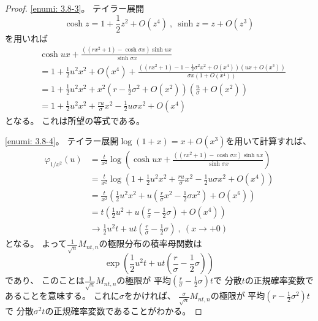 \documentclass[uplatex]{jsarticle}
\theoremstyle{definition}
\begin{document}
\begin{proof}
  \ref{enumi: 3.8-3}。
  テイラー展開
  \[
  \cosh z = 1 + \frac{1}{2}z^2 + O(z^4) \ , \
  \sinh z = z + O(z^3)
  \]
  を用いれば
  \begin{align*}
    &\cosh ux + \frac{
    ((rx^2+1)- \cosh \sigma x )\sinh ux
    }{\sinh \sigma x} \\
    &= 1 + \frac{1}{2}u^2x^2 + O(x^4)
    + \frac{
    \left((rx^2+1) - 1 - \frac{1}{2}\sigma^2x^2 + O(x^4)\right)(ux + O(x^3))
    }{\sigma x ( 1 + O(x^4))} \\
    &= 1 + \frac{1}{2}u^2x^2
    + x^2\left( r - \frac{1}{2}\sigma^2 + O(x^2)\right)
    \left( \frac{u}{\sigma} + O(x^2)\right) \\
    &= 1 + \frac{1}{2}u^2x^2
    + \frac{ru}{\sigma}x^2 - \frac{1}{2}u\sigma x^2 + O(x^4)
  \end{align*}
  となる。
  これは所望の等式である。

  \ref{enumi: 3.8-4}。
  テイラー展開\(\log(1+x) = x + O(x^3)\)を用いて計算すれば、
  \begin{align*}
    \varphi_{1/x^2}(u)
    &= \frac{t}{x^2}\log \left(
    \cosh ux + \frac{
    ((rx^2+1)- \cosh \sigma x )\sinh ux
    }{\sinh \sigma x}\right) \\
    &= \frac{t}{x^2}\log \left(
    1 + \frac{1}{2}u^2x^2
    + \frac{ru}{\sigma}x^2 - \frac{1}{2}u\sigma x^2 + O(x^4)
    \right) \\
    &= \frac{t}{x^2}\left(
    \frac{1}{2}u^2x^2
    + u\left( \frac{r}{\sigma}x^2 - \frac{1}{2}\sigma x^2\right) + O(x^6)
    \right) \\
    &= t\left(
    \frac{1}{2}u^2
    + u\left( \frac{r}{\sigma} - \frac{1}{2}\sigma \right) + O(x^4)
    \right) \\
    &\to \frac{1}{2}u^2t + ut \left(
    \frac{r}{\sigma} - \frac{1}{2}\sigma
    \right)
    \ , \ (x\to +0)
  \end{align*}
  となる。
  よって\(\frac{1}{\sqrt{n}}M_{nt,n}\)の極限分布の積率母関数は
  \[
  \exp \left( \frac{1}{2}u^2t + ut \left(
  \frac{r}{\sigma} - \frac{1}{2}\sigma
  \right)\right)
  \]
  であり、
  このことは\(\frac{1}{\sqrt{n}}M_{nt,n}\)の極限が
  平均\( \left(\frac{r}{\sigma} - \frac{1}{2}\sigma\right) t\)で
  分散\(t\)の正規確率変数であることを意味する。
  これに\(\sigma\)をかければ、
  \(\frac{\sigma}{\sqrt{n}}M_{nt,n}\)の極限が
  平均\(\left( r - \frac{1}{2}\sigma^2\right) t\)で
  分散\(\sigma^2t\)の正規確率変数であることがわかる。
\end{proof}
\end{document}

